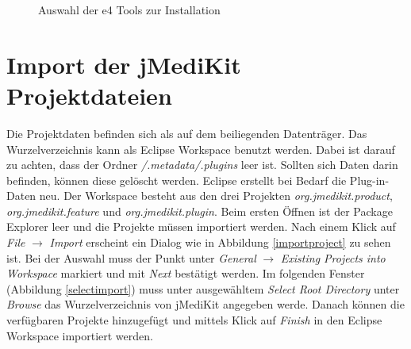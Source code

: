 \begin{figure}[H]
  \vspace{0.5cm}
  \centering
  \caption{Auswahl der e4 Tools zur Installation}
  \label{e4install}
  \vspace{0.5cm}
\end{figure}

\section{Import der jMediKit Projektdateien}

Die Projektdaten befinden sich als auf dem beiliegenden Datenträger. Das Wurzelverzeichnis kann als Eclipse Workspace benutzt werden. Dabei ist darauf zu achten, dass der Ordner \textit{/.metadata/.plugins} leer ist. Sollten sich Daten darin befinden, können diese gelöscht werden. Eclipse erstellt bei Bedarf die Plug-in-Daten neu. Der Workspace besteht aus den drei Projekten \textit{org.jmedikit.product}, \textit{org.jmedikit.feature} und \textit{org.jmedikit.plugin}. Beim ersten Öffnen ist der Package Explorer leer und die Projekte müssen importiert werden. Nach einem Klick auf \textit{File} $\rightarrow$ \textit{Import} erscheint ein Dialog wie in Abbildung \ref{importproject} zu sehen ist. Bei der Auswahl muss der Punkt unter \textit{General} $\rightarrow$ \textit{Existing Projects into Workspace} markiert und mit \textit{Next} bestätigt werden. Im folgenden Fenster (Abbildung \ref{selectimport}) muss unter ausgewähltem \textit{Select Root Directory} unter \textit{Browse} das Wurzelverzeichnis von jMediKit angegeben werde. Danach können die verfügbaren Projekte hinzugefügt und mittels Klick auf \textit{Finish} in den Eclipse Workspace importiert werden.

